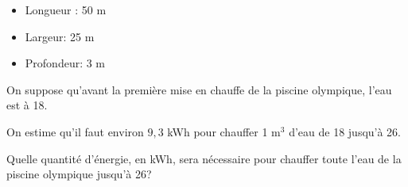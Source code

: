 \documentclass[exercice,a4]{thedocument}%
\begin{document}
\begin{enumerate}
\begin{itemize}
\item Longueur : 50 m
\item Largeur: 25 m
\item Profondeur: 3 m
\end{itemize}

On suppose qu'avant la première mise en chauffe de la piscine olympique, l'eau est à 18\degres.

On estime qu'il faut environ $9,3$ kWh pour chauffer 1 m$^3$ d'eau de 18\degres{} jusqu'à 26\degres.

Quelle quantité d'énergie, en kWh, sera nécessaire pour chauffer toute l'eau de la piscine olympique jusqu'à 26\degres ?

\end{enumerate}

\bigskip
\showthesource
\end{document}
